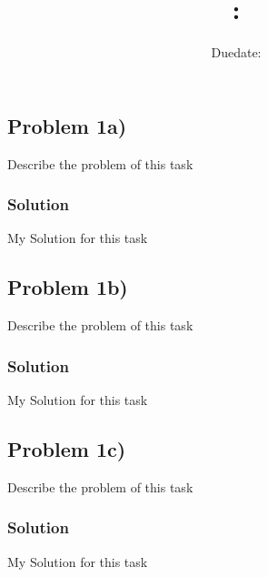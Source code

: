 \documentclass[oneside]{article}
\title{
    \textsf{\textbf{\hmwkSubject: \hmwkTitle}}
}
\author{\hmwkAuthor}
\date{Duedate: \hmwkDueDate}
\begin{document}
\maketitle
\thispagestyle{firststyle}
\vspace{1cm}


\subsection*{Problem 1a)}
Describe the problem of this task

\subsubsection*{Solution}
My Solution for this task

\vspace{0.5cm}

\subsection*{Problem 1b)}
Describe the problem of this task

\subsubsection*{Solution}
My Solution for this task

\vspace{0.5cm}

\subsection*{Problem 1c)}
Describe the problem of this task

\subsubsection*{Solution}
My Solution for this task

\vspace{0.5cm}


\label{LastPage}
\end{document}
